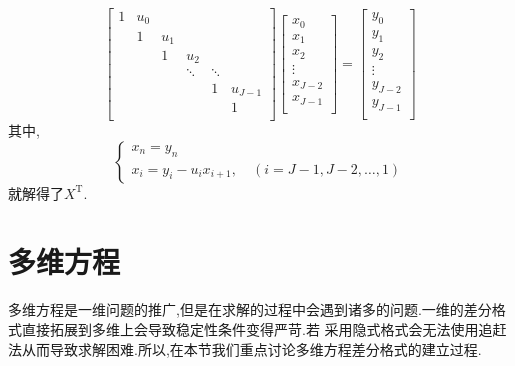 \begin{equation}
\begin{bmatrix}
1 & u_0       \\
  &  1  & u_1 \\
  &     &   1  &  u_2 \\
  &     &      &   \ddots & \ddots \\
  &     &      &          &    1   & u_{J-1} \\
  &     &      &          &        &      1   \\
\end{bmatrix}
\begin{bmatrix}
x_0 \\
x_1 \\
x_2 \\
\vdots \\
x_{J-2} \\
x_{J-1} \\
\end{bmatrix}=
\begin{bmatrix}
y_0 \\
y_1 \\
y_2 \\
\vdots \\
y_{J-2} \\
y_{J-1} \\ 
\end{bmatrix}
\end{equation}
其中,
\begin{equation}
\begin{cases}
x_n=y_n \\
x_i=y_i-u_ix_{i+1},\quad (i=J-1,J-2,\ldots,1)
\end{cases}
\end{equation}
就解得了$X^{\mathrm{T}}$.
\section{多维方程}
多维方程是一维问题的推广,但是在求解的过程中会遇到诸多的问题.一维的差分格式直接拓展到多维上会导致稳定性条件变得严苛.若
采用隐式格式会无法使用追赶法从而导致求解困难.所以,在本节我们重点讨论多维方程差分格式的建立过程.
